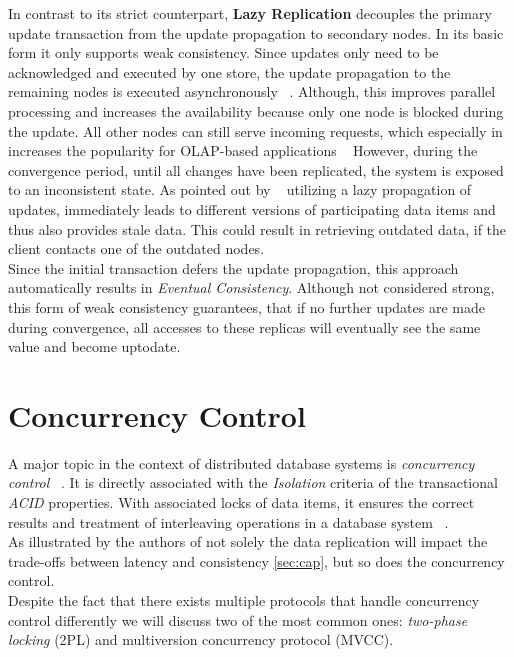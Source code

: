 In contrast to its strict counterpart, \textbf{Lazy Replication} decouples the primary update transaction from the update propagation to secondary nodes.
In its basic form it only supports weak consistency. Since updates only need to be acknowledged and executed by one store, 
the update propagation to the remaining nodes is executed asynchronously ~\cite{fekete:2018}.
Although, this improves parallel processing and increases the availability because only one node is blocked during the update. All other nodes can still serve incoming requests,
which especially in increases the popularity for OLAP-based applications ~\cite{daudjee:2006}
However, during the convergence period, until all changes have been replicated, the system is exposed to an inconsistent state.
As pointed out by ~\cite{cho:2000} utilizing a lazy propagation of updates, immediately leads to different versions of participating data items and thus also provides stale data.
This could result in retrieving outdated data, if the client contacts one of the outdated nodes.
\\
Since the initial transaction defers the update propagation, this approach automatically results in \emph{Eventual Consistency}.
Although not considered strong, this form of weak consistency guarantees, that if no further updates are made 
during convergence, all accesses to these replicas will eventually see the same value and become uptodate. ~\cite{quorums:2003}




\section{Concurrency Control}
\label{sec:concurrency_control}

A major topic in the context of distributed database systems is \emph{concurrency control} ~\cite{bernstein:1981}.
It is directly associated with the \emph{Isolation} criteria of the transactional \emph{ACID} properties.
With associated locks of data items, it ensures the correct results and treatment of interleaving operations in a database system ~\cite{bernstein:1986}.
\\
As illustrated by the authors of \cite{} not solely the data replication will impact the trade-offs between latency and consistency \ref{sec:cap},
but so does the concurrency control.\\

Despite the fact that there exists multiple protocols that handle concurrency control differently we will discuss two of the most common ones: 
\emph{two-phase locking} (2PL) and multiversion concurrency protocol (MVCC).





